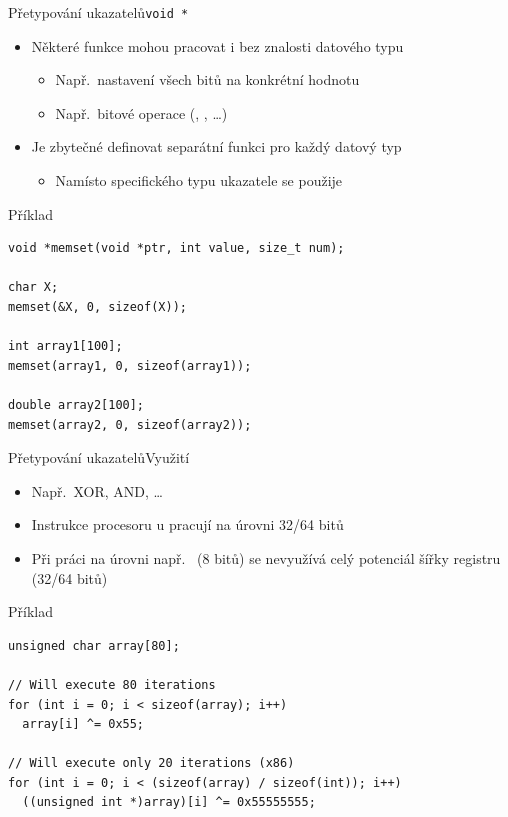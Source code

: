 \begin{frame}[fragile]{Přetypování ukazatelů}{\texttt{void *}}

  \begin{itemize}
    \item Některé funkce mohou pracovat i bez znalosti datového typu
    \begin{itemize}
      \item Např.\ nastavení všech bitů na konkrétní hodnotu
      \item Např.\ bitové operace (\code{^}, \code{\&}, \dots)
    \end{itemize}

    \pause

    \item Je zbytečné definovat separátní funkci pro každý datový typ
    \begin{itemize}
      \item Namísto specifického typu ukazatele se použije 
    \end{itemize}

  \end{itemize}

  \pause

\begin{block}{Příklad}
\begin{lstlisting}
void *memset(void *ptr, int value, size_t num);

char X;
memset(&X, 0, sizeof(X));

int array1[100];
memset(array1, 0, sizeof(array1));

double array2[100];
memset(array2, 0, sizeof(array2));
\end{lstlisting}
\end{block}

\end{frame}

\begin{frame}[fragile]{Přetypování ukazatelů}{Využití}

  \begin{itemize}
    \item Např.\ XOR, AND, \dots
    \item Instrukce procesoru u \xes pracují na úrovni 32/64 bitů
    \item Při práci na úrovni např.\  (8 bitů) se nevyužívá celý
      potenciál šířky registru (32/64 bitů)
  \end{itemize}

  \pause

\begin{block}{Příklad}
\begin{lstlisting}
unsigned char array[80];

// Will execute 80 iterations
for (int i = 0; i < sizeof(array); i++)
  array[i] ^= 0x55;

// Will execute only 20 iterations (x86)
for (int i = 0; i < (sizeof(array) / sizeof(int)); i++)
  ((unsigned int *)array)[i] ^= 0x55555555;
\end{lstlisting}
\end{block}

\end{frame}


